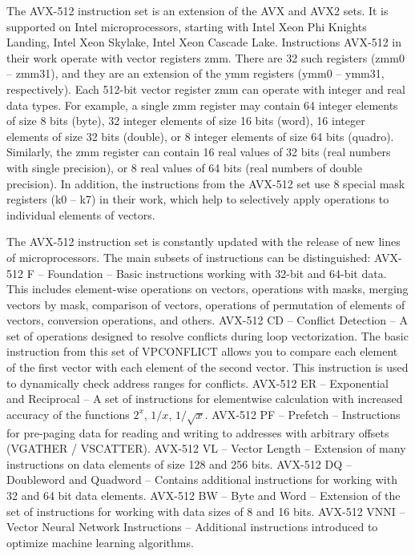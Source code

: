 \documentclass[
11pt,%
tightenlines,%
twoside,%
onecolumn,%
nofloats,%
nobibnotes,%
nofootinbib,%
superscriptaddress,%
noshowpacs,%
centertags]%
{revtex4}
\begin{document}
The AVX-512 instruction set is an extension of the AVX and AVX2 sets.
It is supported on Intel microprocessors, starting with Intel Xeon Phi Knights Landing, Intel Xeon Skylake, Intel Xeon Cascade Lake.
Instructions AVX-512 in their work operate with vector registers zmm.
There are 32 such registers (zmm0 -- zmm31), and they are an extension of the ymm registers (ymm0 -- ymm31, respectively).
Each 512-bit vector register zmm can operate with integer and real data types.
For example, a single zmm register may contain 64 integer elements of size 8 bits (byte), 32 integer elements of size 16 bits (word), 16 integer elements of size 32 bits (double), or 8 integer elements of size 64 bits (quadro).
Similarly, the zmm register can contain 16 real values of 32 bits (real numbers with single precision), or 8 real values of 64 bits (real numbers of double precision).
In addition, the instructions from the AVX-512 set use 8 special mask registers (k0 -- k7) in their work, which help to selectively apply operations to individual elements of vectors.
    
The AVX-512 instruction set is constantly updated with the release of new lines of microprocessors.
The main subsets of instructions can be distinguished:
AVX-512 F -- Foundation -- Basic instructions working with 32-bit and 64-bit data.
This includes element-wise operations on vectors, operations with masks, merging vectors by mask, comparison of vectors, operations of permutation of elements of vectors, conversion operations, and others.
AVX-512 CD -- Conflict Detection -- A set of operations designed to resolve conflicts during loop vectorization. The basic instruction from this set of VPCONFLICT allows you to compare each element of the first vector with each element of the second vector. This instruction is used to dynamically check address ranges for conflicts.
AVX-512 ER -- Exponential and Reciprocal -- A set of instructions for elementwise calculation with increased accuracy of the functions $2^x$, $1/x$, $1/\sqrt{x}$.
AVX-512 PF -- Prefetch -- Instructions for pre-paging data for reading and writing to addresses with arbitrary offsets (VGATHER / VSCATTER).
AVX-512 VL -- Vector Length -- Extension of many instructions on data elements of size 128 and 256 bits.
AVX-512 DQ -- Doubleword and Quadword -- Contains additional instructions for working with 32 and 64 bit data elements.
AVX-512 BW -- Byte and Word -- Extension of the set of instructions for working with data sizes of 8 and 16 bits.
AVX-512 VNNI -- Vector Neural Network Instructions -- Additional instructions introduced to optimize machine learning algorithms.
\end{document}
